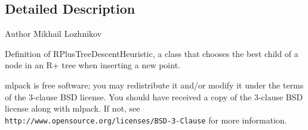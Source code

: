 \subsection{Detailed Description}
\begin{DoxyAuthor}{Author}
Mikhail Lozhnikov
\end{DoxyAuthor}
Definition of R\+Plus\+Tree\+Descent\+Heuristic, a class that chooses the best child of a node in an R+ tree when inserting a new point.

mlpack is free software; you may redistribute it and/or modify it under the terms of the 3-\/clause B\+SD license. You should have received a copy of the 3-\/clause B\+SD license along with mlpack. If not, see {\tt http\+://www.\+opensource.\+org/licenses/\+B\+S\+D-\/3-\/\+Clause} for more information. 
